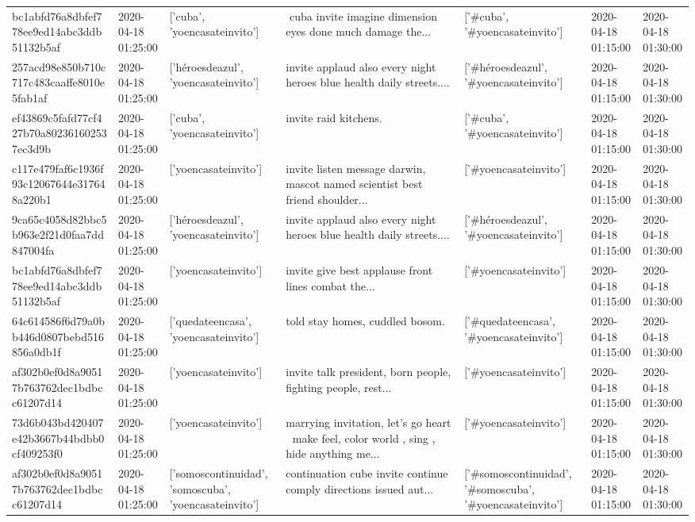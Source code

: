 \begin{tabular}{lllllll}
bc1abfd76a8dbfef778ee9ed14abc3ddb51132b5af & 2020-04-18 01:25:00 & ['cuba', 'yoencasateinvito'] & ️ cuba invite imagine dimension eyes done much damage the... & ['#cuba', '#yoencasateinvito'] & 2020-04-18 01:15:00 & 2020-04-18 01:30:00 \\
257acd98e850b710c717c483caaffe8010e5fab1af & 2020-04-18 01:25:00 & ['héroesdeazul', 'yoencasateinvito'] & invite applaud also every night heroes blue health daily streets.... & ['#héroesdeazul', '#yoencasateinvito'] & 2020-04-18 01:15:00 & 2020-04-18 01:30:00 \\
ef43869c5fafd77cf427b70a802361602537ec3d9b & 2020-04-18 01:25:00 & ['cuba', 'yoencasateinvito'] & invite raid kitchens. & ['#cuba', '#yoencasateinvito'] & 2020-04-18 01:15:00 & 2020-04-18 01:30:00 \\
c117e479faf6c1936f93c12067644e317648a220b1 & 2020-04-18 01:25:00 & ['yoencasateinvito'] & invite listen message darwin, mascot named scientist best friend shoulder... & ['#yoencasateinvito'] & 2020-04-18 01:15:00 & 2020-04-18 01:30:00 \\
9ca65c4058d82bbc5b963e2f21d0faa7dd847004fa & 2020-04-18 01:25:00 & ['héroesdeazul', 'yoencasateinvito'] & invite applaud also every night heroes blue health daily streets.... & ['#héroesdeazul', '#yoencasateinvito'] & 2020-04-18 01:15:00 & 2020-04-18 01:30:00 \\
bc1abfd76a8dbfef778ee9ed14abc3ddb51132b5af & 2020-04-18 01:25:00 & ['yoencasateinvito'] & invite give best applause front lines combat the... & ['#yoencasateinvito'] & 2020-04-18 01:15:00 & 2020-04-18 01:30:00 \\
64c614586f6d79a0bb446d0807bebd516856a0db1f & 2020-04-18 01:25:00 & ['quedateencasa', 'yoencasateinvito'] & told stay homes, cuddled bosom. & ['#quedateencasa', '#yoencasateinvito'] & 2020-04-18 01:15:00 & 2020-04-18 01:30:00 \\
af302b0ef0d8a90517b763762dec1bdbcc61207d14 & 2020-04-18 01:25:00 & ['yoencasateinvito'] & invite talk president, born people, fighting people, rest... & ['#yoencasateinvito'] & 2020-04-18 01:15:00 & 2020-04-18 01:30:00 \\
73d6b043bd420407e42b3667b44bdbb0cf409253f0 & 2020-04-18 01:25:00 & ['yoencasateinvito'] & marrying invitation, let's go heart 💖 make feel, color world , sing , hide anything me... & ['#yoencasateinvito'] & 2020-04-18 01:15:00 & 2020-04-18 01:30:00 \\
af302b0ef0d8a90517b763762dec1bdbcc61207d14 & 2020-04-18 01:25:00 & ['somoscontinuidad', 'somoscuba', 'yoencasateinvito'] & continuation cube invite continue comply directions issued aut... & ['#somoscontinuidad', '#somoscuba', '#yoencasateinvito'] & 2020-04-18 01:15:00 & 2020-04-18 01:30:00 \\

\end{tabular}
